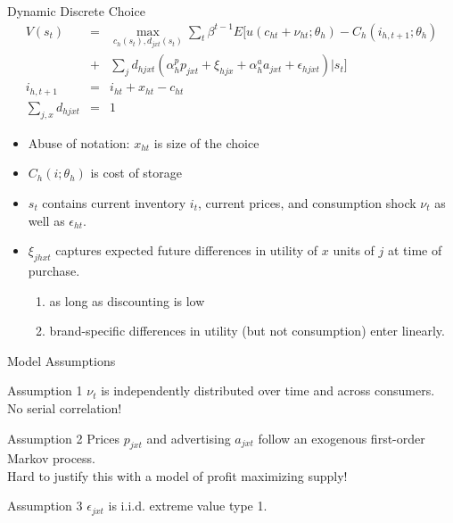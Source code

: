 \begin{frame}{Dynamic Discrete Choice}
\footnotesize
\begin{eqnarray*}
V(s_t)&=& \max_{c_h(s_t),d_{jxt}(s_t)} \sum_t \beta^{t-1} E[ u(c_{ht}+\nu_{ht}; \theta_h) - C_h(i_{h,t+1};\theta_h) \\
&+&\sum_j d_{hjxt} (\alpha_h^p p_{jxt} + \xi_{hjx} + \alpha_h^a a_{jxt} + \epsilon_{hjxt} )| s_t]\\
i_{h,t+1} &=& i_{ht} + x_{ht} - c_{ht}\\
\sum_{j,x} d_{hjxt} &=& 1
\end{eqnarray*}
\begin{itemize}
\item Abuse of notation: $x_{ht}$ is size of the choice
\item $C_h(i; \theta_h)$ is cost of storage
\item $s_t$ contains current inventory $i_t$, current prices, and consumption shock $\nu_t$ as well as $\epsilon_{ht}$.
\item $\xi_{jhxt}$ captures expected future differences in utility of $x$ units of $j$ at time of purchase.
\begin{enumerate}
\item as long as discounting is low
\item brand-specific differences in utility (but not consumption) enter linearly.
\end{enumerate}
\end{itemize}
\end{frame}

\begin{frame}{Model Assumptions}
\begin{block}{Assumption 1}
$\nu_t$ is independently distributed over time and across consumers.\\
 \alert{No serial correlation!}
\end{block}
\begin{block}{Assumption 2}
Prices $p_{jxt}$ and advertising $a_{jxt}$ follow an exogenous first-order Markov process.\\
\alert{Hard to justify this with a model of profit maximizing supply!}
\end{block}
\begin{block}{Assumption 3}
$\epsilon_{jxt}$ is i.i.d. extreme value type 1.
\end{block}
\end{frame}

